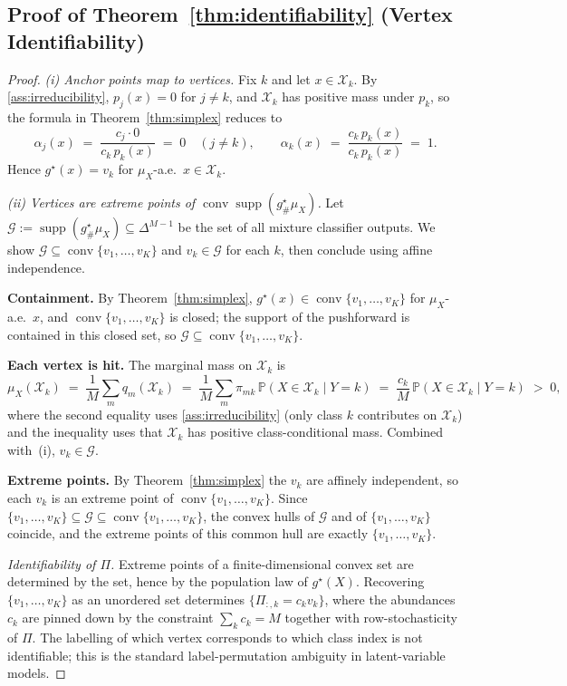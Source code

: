 \documentclass{article}
\theoremstyle{plain}
\theoremstyle{definition}
\theoremstyle{remark}
\newcommand{\Pp}{\mathbb{P}}
\newcommand{\X}{\mathcal{X}}
\DeclareMathOperator{\conv}{conv}
\DeclareMathOperator{\supp}{supp}
\newcommand{\asmp}[1]{\ref{#1}} %
\begin{document}
\subsection{Proof of Theorem~\ref{thm:identifiability} (Vertex Identifiability)}
\label{app:proofs:identifiability}

\begin{proof}
\emph{(i) Anchor points map to vertices.} Fix $k$ and let $x \in \X_k$. By \asmp{ass:irreducibility}, $p_j(x) = 0$ for $j \ne k$, and $\X_k$ has positive mass under $p_k$, so the formula in Theorem~\ref{thm:simplex} reduces to
\begin{equation}
\alpha_j(x) \;=\; \frac{c_j \cdot 0}{c_k\, p_k(x)} \;=\; 0 \quad (j \ne k), \qquad \alpha_k(x) \;=\; \frac{c_k\, p_k(x)}{c_k\, p_k(x)} \;=\; 1.
\end{equation}
Hence $g^\star(x) = v_k$ for $\mu_X$-a.e.\ $x \in \X_k$.

\emph{(ii) Vertices are extreme points of $\conv \supp(g^\star_\#\mu_X)$.} Let $\mathcal{G} := \supp(g^\star_\#\mu_X) \subseteq \Delta^{M-1}$ be the set of all mixture classifier outputs. We show $\mathcal{G} \subseteq \conv\{v_1,\dots,v_K\}$ and $v_k \in \mathcal{G}$ for each $k$, then conclude using affine independence.

\textbf{Containment.} By Theorem~\ref{thm:simplex}, $g^\star(x) \in \conv\{v_1,\dots,v_K\}$ for $\mu_X$-a.e.\ $x$, and $\conv\{v_1,\dots,v_K\}$ is closed; the support of the pushforward is contained in this closed set, so $\mathcal{G} \subseteq \conv\{v_1,\dots,v_K\}$.

\textbf{Each vertex is hit.} The marginal mass on $\X_k$ is
\begin{equation}
\mu_X(\X_k) \;=\; \frac{1}{M}\sum_m q_m(\X_k) \;=\; \frac{1}{M}\sum_m \pi_{mk}\, \Pp(X\in\X_k \mid Y=k) \;=\; \frac{c_k}{M}\, \Pp(X\in\X_k \mid Y=k) \;>\; 0,
\end{equation}
where the second equality uses \asmp{ass:irreducibility} (only class $k$ contributes on $\X_k$) and the inequality uses that $\X_k$ has positive class-conditional mass. Combined with~(i), $v_k \in \mathcal{G}$.

\textbf{Extreme points.} By Theorem~\ref{thm:simplex} the $v_k$ are affinely independent, so each $v_k$ is an extreme point of $\conv\{v_1,\dots,v_K\}$. Since $\{v_1,\dots,v_K\} \subseteq \mathcal{G} \subseteq \conv\{v_1,\dots,v_K\}$, the convex hulls of $\mathcal{G}$ and of $\{v_1,\dots,v_K\}$ coincide, and the extreme points of this common hull are exactly $\{v_1,\dots,v_K\}$.

\emph{Identifiability of $\Pi$.} Extreme points of a finite-dimensional convex set are determined by the set, hence by the population law of $g^\star(X)$. Recovering $\{v_1,\dots,v_K\}$ as an unordered set determines $\{\Pi_{:,k} = c_k v_k\}$, where the abundances $c_k$ are pinned down by the constraint $\sum_k c_k = M$ together with row-stochasticity of $\Pi$. The labelling of which vertex corresponds to which class index is not identifiable; this is the standard label-permutation ambiguity in latent-variable models.
\end{proof}
\end{document}
